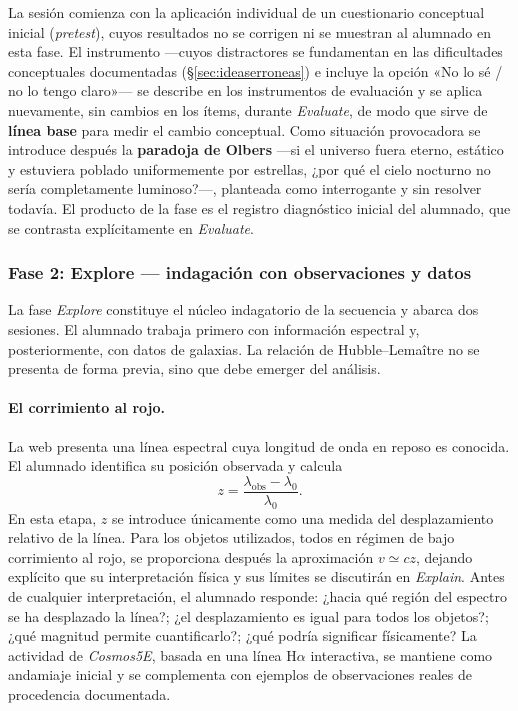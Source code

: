 La sesión comienza con la aplicación individual de un cuestionario conceptual inicial (\textit{pretest}), cuyos resultados no se corrigen ni se muestran al alumnado en esta fase. El instrumento ---cuyos distractores se fundamentan en las dificultades conceptuales documentadas (§\ref{sec:ideaserroneas}) e incluye la opción «No lo sé / no lo tengo claro»--- se describe en los instrumentos de evaluación y se aplica nuevamente, sin cambios en los ítems, durante \textit{Evaluate}, de modo que sirve de \textbf{línea base} para medir el cambio conceptual. Como situación provocadora se introduce después la \textbf{paradoja de Olbers} ---si el universo fuera eterno, estático y estuviera poblado uniformemente por estrellas, ¿por qué el cielo nocturno no sería completamente luminoso?---, planteada como interrogante y sin resolver todavía. El producto de la fase es el registro diagnóstico inicial del alumnado, que se contrasta explícitamente en \textit{Evaluate}.

\subsubsection{Fase 2: Explore --- indagación con observaciones y datos}\label{sec:explore}

La fase \textit{Explore} constituye el núcleo indagatorio de la secuencia y abarca dos sesiones. El alumnado trabaja primero con información espectral y, posteriormente, con datos de galaxias. La relación de Hubble--Lemaître no se presenta de forma previa, sino que debe emerger del análisis.

\paragraph{El corrimiento al rojo.} La web presenta una línea espectral cuya longitud de onda en reposo es conocida. El alumnado identifica su posición observada y calcula
\begin{equation}
z=\frac{\lambda_{\mathrm{obs}}-\lambda_0}{\lambda_0}.
\end{equation}
En esta etapa, $z$ se introduce únicamente como una medida del desplazamiento relativo de la línea. Para los objetos utilizados, todos en régimen de bajo corrimiento al rojo, se proporciona después la aproximación $v\simeq cz$, dejando explícito que su interpretación física y sus límites se discutirán en \textit{Explain}. Antes de cualquier interpretación, el alumnado responde: ¿hacia qué región del espectro se ha desplazado la línea?; ¿el desplazamiento es igual para todos los objetos?; ¿qué magnitud permite cuantificarlo?; ¿qué podría significar físicamente? La actividad de \textit{Cosmos5E}, basada en una línea H$\alpha$ interactiva, se mantiene como andamiaje inicial y se complementa con ejemplos de observaciones reales de procedencia documentada.

